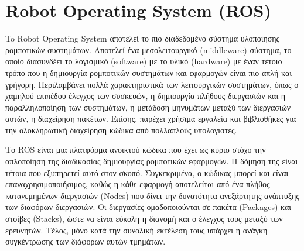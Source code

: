 \section{Robot Operating System (ROS)}
\label{section}

To Robot Operating System \cite{ros2009} αποτελεί το πιο διαδεδομένο σύστημα υλοποίησης ρομποτικών συστημάτων. Αποτελεί ένα μεσολειτουργικό (middleware) σύστημα, το οποίο διασυνδέει το λογισμικό (software) με το υλικό (hardware) με έναν τέτοιο τρόπο που η δημιουργία ρομποτικών συστημάτων και εφαρμογών είναι πιο απλή και γρήγορη. Περιλαμβάνει πολλά χαρακτηριστικά των λειτουργικών συστημάτων, όπως ο χαμηλού επιπέδου έλεγχος των συσκευών, η δημιουργία πλήθους διεργασιών και η παραλληλοποίηση των συστημάτων, η μετάδοση μηνυμάτων μεταξύ των διεργασιών αυτών, η διαχείρηση πακέτων. Επίσης, παρέχει χρήσιμα εργαλεία και βιβλιοθήκες για την ολοκληρωτική διαχείρηση κώδικα από πολλαπλούς υπολογιστές. 

Το ROS είναι μια πλατφόρμα ανοικτού κώδικα που έχει ως κύριο στόχο την απλοποίηση της διαδικασίας δημιουργίας ρομποτικών εφαρμογών. Η δόμηση της είναι τέτοια που εξυπηρετεί αυτό στον σκοπό. Συγκεκριμένα, ο κώδικας μπορεί και είναι επαναχρησιμοποιήσιμος, καθώς η κάθε εφαρμογή αποτελείται από ένα πλήθος κατανεμημένων διεργασιών (Nodes) που δίνει την δυνατότητα ανεξάρτητης ανάπτυξης των διαφόρων διεργασιών. Οι διεργασίες ομαδοποιούνται σε πακέτα (Packages) και στοίβες (Stacks), ώστε να είναι εύκολη η διανομή και ο έλεγχος τους μεταξύ των ερευνητών. Τέλος, μόνο κατά την συνολική εκτέλεση τους υπάρχει η ανάγκη συγκέντρωσης των διάφορων αυτών τμημάτων.
